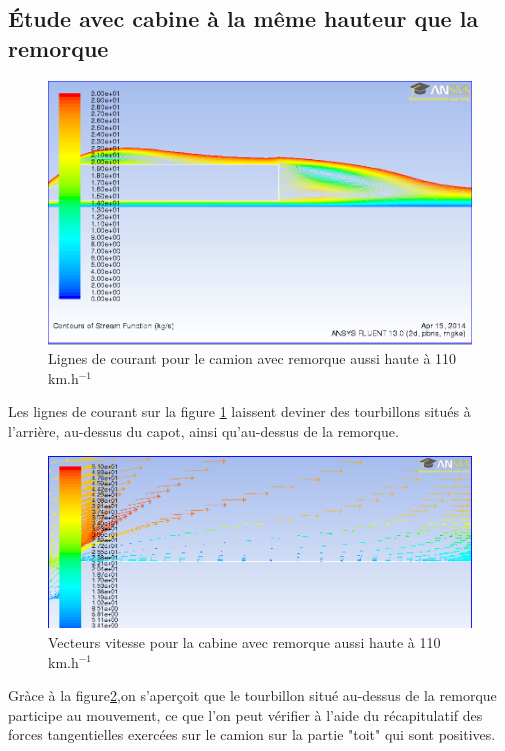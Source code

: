\subsection{Étude avec cabine à la même hauteur que la remorque}
\begin{figure}[!h]
\centering
\includegraphics[scale=0.4]{resultsCx/remorque1_110_stream.png}
\caption{Lignes de courant pour le camion avec remorque aussi haute à 110 km.h$^{-1}$}
\label{figRem1Stream110}
\end{figure}

Les lignes de courant sur la figure \ref{figRem1Stream110} laissent deviner des tourbillons situés à l'arrière, au-dessus du capot, ainsi qu'au-dessus de la remorque.%
\begin{figure}[!h]
\centering
\includegraphics[scale=0.4]{resultsCx/rem1_110_vectvit.png}
\caption{Vecteurs vitesse pour la cabine avec remorque aussi haute à 110 km.h$^{-1}$}
\label{figrem1Vit110}
\end{figure}

Gràce à la figure\ref{figrem1Vit110},on s'aperçoit que le tourbillon situé au-dessus de la remorque participe au mouvement, ce que l'on peut vérifier à l'aide du récapitulatif des forces tangentielles exercées sur le camion sur la partie "toit" qui sont positives. 

